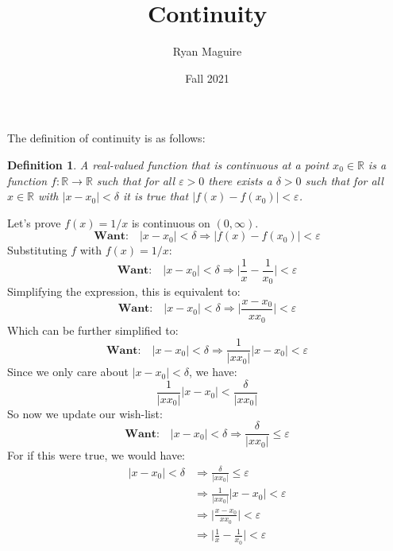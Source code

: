 \documentclass{article}
\title{Continuity}
\author{Ryan Maguire}
\date{Fall 2021}
\theoremstyle{normal}
\newtheorem{definition}{Definition}
\begin{document}
    \maketitle
    The definition of continuity is as follows:
    \begin{definition}
        A real-valued function that is continuous at a point
        $x_{0}\in\mathbb{R}$ is a function $f:\mathbb{R}\rightarrow\mathbb{R}$
        such that for all $\varepsilon>0$ there exists a $\delta>0$ such that
        for all $x\in\mathbb{R}$ with $|x-x_{0}|<\delta$ it is true that
        $|f(x)-f(x_{0})|<\varepsilon$.
    \end{definition}
    Let's prove $f(x)=1/x$ is continuous on $(0,\infty)$.
    \begin{equation}
        \textbf{Want:}\quad
        |x-x_{0}|<\delta
        \Rightarrow
        |f(x)-f(x_{0})|<\varepsilon
    \end{equation}
    Substituting $f$ with $f(x)=1/x$:
    \begin{equation}
        \textbf{Want:}\quad
        |x-x_{0}|<\delta
        \Rightarrow
        \big|\frac{1}{x}-\frac{1}{x_{0}}\big|<\varepsilon
    \end{equation}
    Simplifying the expression, this is equivalent to:
    \begin{equation}
        \textbf{Want:}\quad
        |x-x_{0}|<\delta
        \Rightarrow
        \big|\frac{x-x_{0}}{xx_{0}}\big|<\varepsilon
    \end{equation}
    Which can be further simplified to:
    \begin{equation}
        \textbf{Want:}\quad
        |x-x_{0}|<\delta
        \Rightarrow
        \frac{1}{|xx_{0}|}|x-x_{0}|<\varepsilon
    \end{equation}
    Since we only care about $|x-x_{0}|<\delta$, we have:
    \begin{equation}
        \frac{1}{|xx_{0}|}|x-x_{0}|<\frac{\delta}{|xx_{0}|}
    \end{equation}
    So now we update our wish-list:
    \begin{equation}
        \textbf{Want:}\quad
        |x-x_{0}|<\delta
        \Rightarrow
        \frac{\delta}{|xx_{0}|}\leq\varepsilon
    \end{equation}
    For if this were true, we would have:
    \begin{align}
        |x-x_{0}|<\delta&\Rightarrow\frac{\delta}{|xx_{0}|}\leq\varepsilon\\
        &\Rightarrow\frac{1}{|xx_{0}|}|x-x_{0}|<\varepsilon\\
        &\Rightarrow\big|\frac{x-x_{0}}{xx_{0}}\big|<\varepsilon\\
        &\Rightarrow\big|\frac{1}{x}-\frac{1}{x_{0}}\big|<\varepsilon
    \end{align}
\end{document}
